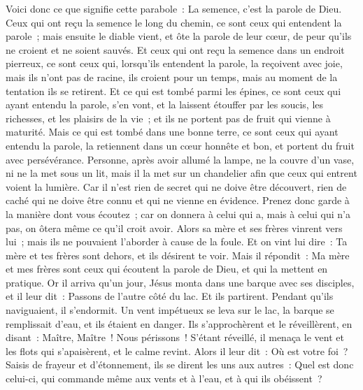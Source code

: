 \begin{multicols}{2}
Voici donc ce que signifie cette parabole~: La semence, c'est la parole de Dieu.
Ceux qui ont reçu la semence le long du chemin, ce sont ceux qui entendent la parole~; mais ensuite le diable vient, et ôte la parole de leur cœur, de peur qu'ils ne croient et ne soient sauvés.
Et ceux qui ont reçu la semence dans un endroit pierreux, ce sont ceux qui, lorsqu'ils entendent la parole, la reçoivent avec joie, mais ils n'ont pas de racine, ils croient pour un temps, mais au moment de la tentation ils se retirent.
Et ce qui est tombé parmi les épines, ce sont ceux qui ayant entendu la parole, s'en vont, et la laissent étouffer par les soucis, les richesses, et les plaisirs de la vie~; et ils ne portent pas de fruit qui vienne à maturité.
Mais ce qui est tombé dans une bonne terre, ce sont ceux qui ayant entendu la parole, la retiennent dans un cœur honnête et bon, et portent du fruit avec persévérance.
Personne, après avoir allumé la lampe, ne la couvre d'un vase, ni ne la met sous un lit, mais il la met sur un chandelier afin que ceux qui entrent voient la lumière.
Car il n'est rien de secret qui ne doive être découvert, rien de caché qui ne doive être connu et qui ne vienne en évidence.
Prenez donc garde à la manière dont vous écoutez~; car on donnera à celui qui a, mais à celui qui n'a pas, on ôtera même ce qu'il croit avoir.
Alors sa mère et ses frères vinrent vers lui~; mais ils ne pouvaient l'aborder à cause de la foule.
Et on vint lui dire~: Ta mère et tes frères sont dehors, et ils désirent te voir.
Mais il répondit~: Ma mère et mes frères sont ceux qui écoutent la parole de Dieu, et qui la mettent en pratique.
Or il arriva qu'un jour, Jésus monta dans une barque avec ses disciples, et il leur dit~: Passons de l'autre côté du lac. Et ils partirent.
Pendant qu'ils naviguaient, il s'endormit. Un vent impétueux se leva sur le lac, la barque se remplissait d'eau, et ils étaient en danger.
Ils s'approchèrent et le réveillèrent, en disant~: Maître, Maître~! Nous périssons~! S'étant réveillé, il menaça le vent et les flots qui s'apaisèrent, et le calme revint.
Alors il leur dit~: Où est votre foi~? Saisis de frayeur et d'étonnement, ils se dirent les uns aux autres~: Quel est donc celui-ci, qui commande même aux vents et à l'eau, et à qui ils obéissent~?

\end{multicols}
